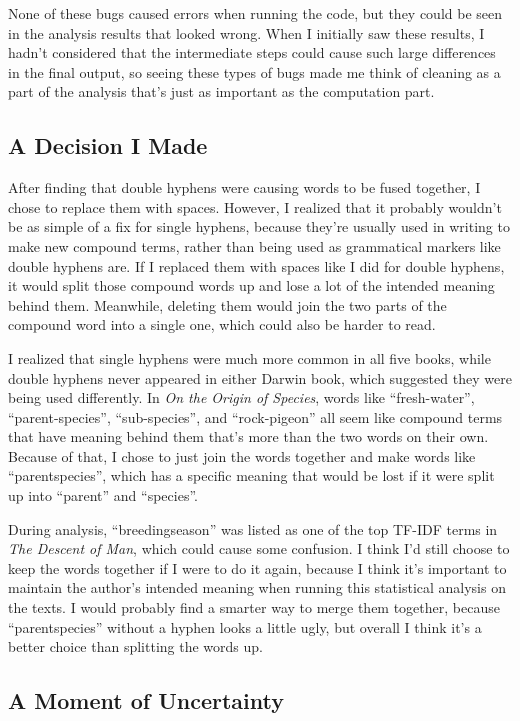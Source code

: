 \documentclass[11pt]{article}
\begin{document}
None of these bugs caused errors when running the code, but they could be seen in the analysis results that looked wrong.
When I initially saw these results, I hadn't considered that the intermediate steps could cause such large differences in the final output, so seeing these types of bugs made me think of cleaning as a part of the analysis that's just as important as the computation part.

\subsection{A Decision I Made}

After finding that double hyphens were causing words to be fused together, I chose to replace them with spaces.
However, I realized that it probably wouldn't be as simple of a fix for single hyphens, because they're usually used in writing to make new compound terms, rather than being used as grammatical markers like double hyphens are.
If I replaced them with spaces like I did for double hyphens, it would split those compound words up and lose a lot of the intended meaning behind them.
Meanwhile, deleting them would join the two parts of the compound word into a single one, which could also be harder to read.

I realized that single hyphens were much more common in all five books, while double hyphens never appeared in either Darwin book, which suggested they were being used differently.
In \emph{On the Origin of Species}, words like ``fresh-water'', ``parent-species'', ``sub-species'', and ``rock-pigeon'' all seem like compound terms that have meaning behind them that's more than the two words on their own.
Because of that, I chose to just join the words together and make words like ``parentspecies'', which has a specific meaning that would be lost if it were split up into ``parent'' and ``species''.

During analysis, ``breedingseason'' was listed as one of the top TF-IDF terms in \emph{The Descent of Man}, which could cause some confusion.
I think I'd still choose to keep the words together if I were to do it again, because I think it's important to maintain the author's intended meaning when running this statistical analysis on the texts.
I would probably find a smarter way to merge them together, because ``parentspecies'' without a hyphen looks a little ugly, but overall I think it's a better choice than splitting the words up.

\subsection{A Moment of Uncertainty}
\end{document}
